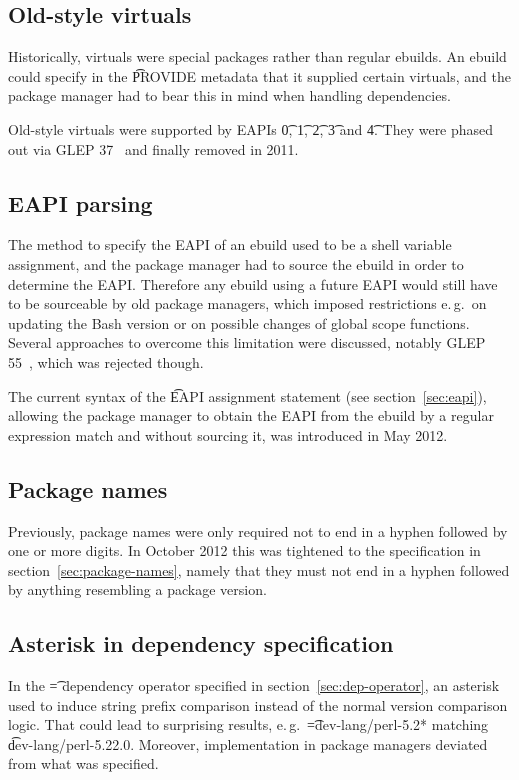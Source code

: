 \subsection{Old-style virtuals}
Historically, virtuals were special packages rather than regular ebuilds. An ebuild could specify in
the \t{PROVIDE} metadata that it supplied certain virtuals, and the package manager had to bear this
in mind when handling dependencies.

Old-style virtuals were supported by EAPIs \t{0}, \t{1}, \t{2}, \t{3} and \t{4}. They were phased
out via GLEP 37~\cite{Glep37} and finally removed in 2011.


\subsection{EAPI parsing}
The method to specify the EAPI of an ebuild used to be a shell variable assignment, and the package
manager had to source the ebuild in order to determine the EAPI\@. Therefore any ebuild using
a future EAPI would still have to be sourceable by old package managers, which imposed restrictions
e.\,g.\ on updating the Bash version or on possible changes of global scope functions. Several
approaches to overcome this limitation were discussed, notably GLEP 55~\cite{Glep55}, which was
rejected though.

The current syntax of the \t{EAPI} assignment statement (see section~\ref{sec:eapi}), allowing
the package manager to obtain the EAPI from the ebuild by a regular expression match and without
sourcing it, was introduced in May 2012.

\subsection{Package names}
Previously, package names were only required not to end in a hyphen followed by one or more digits.
In October 2012 this was tightened to the specification in section~\ref{sec:package-names}, namely
that they must not end in a hyphen followed by anything resembling a package version.

\subsection{Asterisk in dependency specification}
In the \t{=} dependency operator specified in section~\ref{sec:dep-operator}, an asterisk used to
induce string prefix comparison instead of the normal version comparison logic. That could lead to
surprising results, e.\,g.\ \t{=dev-lang/perl-5.2*} matching \t{dev-lang/perl-5.22.0}. Moreover,
implementation in package managers deviated from what was specified.

